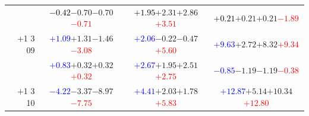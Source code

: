 \documentclass[compress]{beamer}
\begin{document}
\begin{frame}
\begin{tabular}{r | c | c | c}
          & \textcolor{black}{$-0.42$}\hspace{0.1 cm}$-0.70$\hspace{0.1 cm}$-0.70$\hspace{0.1 cm}\textcolor{red}{$-0.71$} & \textcolor{black}{$+1.95$}\hspace{0.1 cm}$+2.31$\hspace{0.1 cm}$+2.86$\hspace{0.1 cm}\textcolor{red}{$+3.51$} & \textcolor{black}{$+0.21$}\hspace{0.1 cm}$+0.21$\hspace{0.1 cm}$+0.21$\hspace{0.1 cm}\textcolor{red}{$-1.89$} \\
$+$1 3 09 & \textcolor{blue}{$+1.09$}\hspace{0.1 cm}$+1.31$\hspace{0.1 cm}$-1.46$\hspace{0.1 cm}\textcolor{red}{$-3.08$} & \textcolor{blue}{$+2.06$}\hspace{0.1 cm}$-0.22$\hspace{0.1 cm}$-0.47$\hspace{0.1 cm}\textcolor{red}{$+5.60$} & \textcolor{blue}{$+9.63$}\hspace{0.1 cm}$+2.72$\hspace{0.1 cm}$+8.32$\hspace{0.1 cm}\textcolor{red}{$+9.34$} \\
          & \textcolor{blue}{$+0.83$}\hspace{0.1 cm}$+0.32$\hspace{0.1 cm}$+0.32$\hspace{0.1 cm}\textcolor{red}{$+0.32$} & \textcolor{blue}{$+2.67$}\hspace{0.1 cm}$+1.95$\hspace{0.1 cm}$+2.51$\hspace{0.1 cm}\textcolor{red}{$+2.75$} & \textcolor{blue}{$-0.85$}\hspace{0.1 cm}$-1.19$\hspace{0.1 cm}$-1.19$\hspace{0.1 cm}\textcolor{red}{$-0.38$} \\
$+$1 3 10 & \textcolor{blue}{$-4.22$}\hspace{0.1 cm}$-3.37$\hspace{0.1 cm}$-8.97$\hspace{0.1 cm}\textcolor{red}{$-7.75$} & \textcolor{blue}{$+4.41$}\hspace{0.1 cm}$+2.03$\hspace{0.1 cm}$+1.78$\hspace{0.1 cm}\textcolor{red}{$+5.83$} & \textcolor{blue}{$+12.87$}\hspace{0.1 cm}$+5.14$\hspace{0.1 cm}$+10.34$\hspace{0.1 cm}\textcolor{red}{$+12.80$} \\

\end{tabular}
\end{frame}
\end{document}
